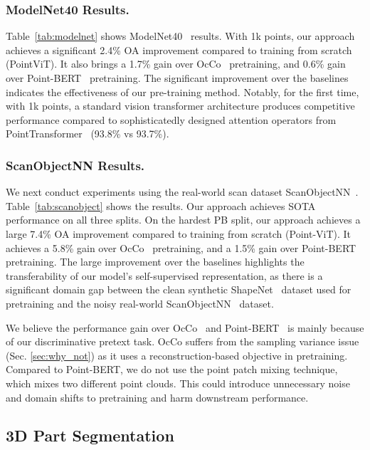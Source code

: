 \documentclass[runningheads]{llncs}
\begin{document}
\vspace{-10pt}
\subsubsection{ModelNet40 Results.}
Table~\ref{tab:modelnet} shows ModelNet40~\cite{wu20153d} results.  With 1k points, our approach achieves a significant 2.4\% OA improvement compared to training from scratch (PointViT).  It also brings a 1.7\% gain over OcCo~\cite{occo} pretraining, and 0.6\% gain over Point-BERT~\cite{yu2021point} pretraining.  The significant improvement over the baselines indicates the effectiveness of our pre-training method.  Notably, for the first time, with 1k points, a standard vision transformer architecture produces competitive performance compared to sophisticatedly designed attention operators from PointTransformer~\cite{zhao2021point} (93.8\% vs 93.7\%).

\vspace{-10pt}
\subsubsection{ScanObjectNN Results.}
We next conduct experiments using the real-world scan dataset ScanObjectNN~\cite{uy2019revisiting}. Table~\ref{tab:scanobject} shows the results.  Our approach achieves SOTA performance on all three splits.  On the hardest PB split, our approach achieves a large 7.4\% OA improvement compared to training from scratch (Point-ViT).  It achieves a 5.8\% gain over OcCo~\cite{occo} pretraining, and a 1.5\% gain over Point-BERT~\cite{yu2021point} pretraining.  The large improvement over the baselines highlights the transferability of our model's self-supervised representation, as there is a significant domain gap between the clean synthetic ShapeNet~\cite{chang2015shapenet} dataset used for pretraining and the noisy real-world ScanObjectNN~\cite{uy2019revisiting} dataset.

We believe the performance gain over OcCo~\cite{occo} and Point-BERT~\cite{yu2021point} is mainly because of our discriminative pretext task.  OcCo suffers from the sampling variance issue (Sec. \ref{sec:why_not}) as it uses a reconstruction-based objective in pretraining.  Compared to Point-BERT, we do not use the point patch mixing technique, which mixes two different point clouds. This could introduce unnecessary noise and domain shifts to pretraining and harm downstream performance.

\subsection{3D Part Segmentation}
\end{document}
